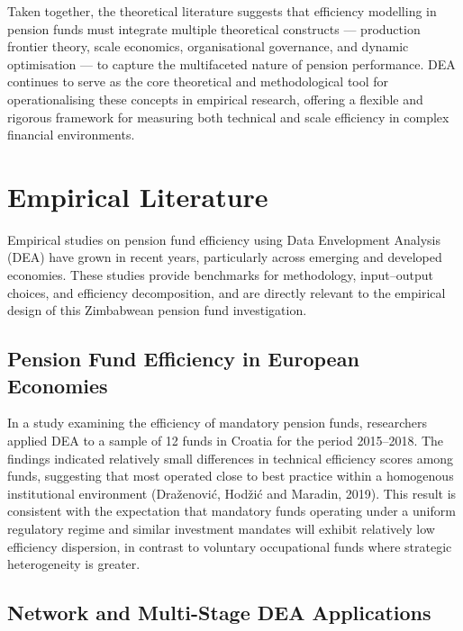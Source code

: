\documentclass[12pt,a4paper]{article}
\begin{document}
Taken together, the theoretical literature suggests that efficiency modelling in pension funds must integrate multiple theoretical constructs --- production frontier theory, scale economics, organisational governance, and dynamic optimisation --- to capture the multifaceted nature of pension performance. DEA continues to serve as the core theoretical and methodological tool for operationalising these concepts in empirical research, offering a flexible and rigorous framework for measuring both technical and scale efficiency in complex financial environments.

\section{Empirical Literature}

Empirical studies on pension fund efficiency using Data Envelopment Analysis (DEA) have grown in recent years, particularly across emerging and developed economies. These studies provide benchmarks for methodology, input--output choices, and efficiency decomposition, and are directly relevant to the empirical design of this Zimbabwean pension fund investigation.

\subsection{Pension Fund Efficiency in European Economies}

In a study examining the efficiency of mandatory pension funds, researchers applied DEA to a sample of 12 funds in Croatia for the period 2015--2018. The findings indicated relatively small differences in technical efficiency scores among funds, suggesting that most operated close to best practice within a homogenous institutional environment (Dra\v{z}enovi\'{c}, Hod\v{z}i\'{c} and Maradin, 2019). This result is consistent with the expectation that mandatory funds operating under a uniform regulatory regime and similar investment mandates will exhibit relatively low efficiency dispersion, in contrast to voluntary occupational funds where strategic heterogeneity is greater.

\subsection{Network and Multi-Stage DEA Applications}
\end{document}
